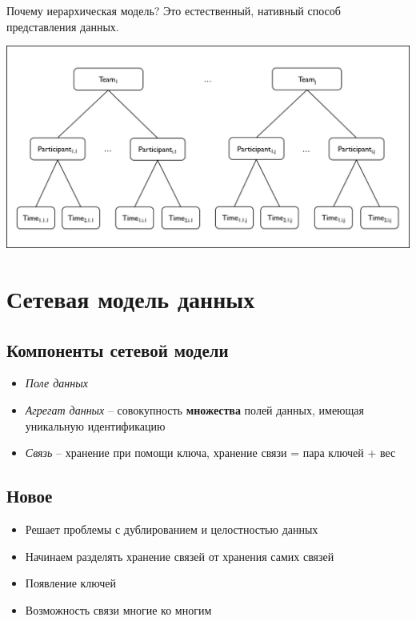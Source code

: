 Почему иерархическая модель? Это естественный, нативный способ представления данных.

\newline

\includegraphics[scale=0.7]{data/hierarchy.jpeg}

\section{Сетевая модель данных}
\subsection{Компоненты сетевой модели}

\begin{itemize}
    \item \emph{Поле данных}
    \item \emph{Агрегат данных} -- совокупность \textbf{множества} полей данных, имеющая уникальную идентификацию
    \item \emph{Связь} -- хранение при помощи ключа, хранение связи = пара ключей + вес
\end{itemize}

\subsection{Новое}

\begin{itemize}
    \item Решает проблемы с дублированием и целостностью данных
    \item Начинаем разделять хранение связей от хранения самих связей
    \item Появление ключей
    \item Возможность связи многие ко многим
\end{itemize}

